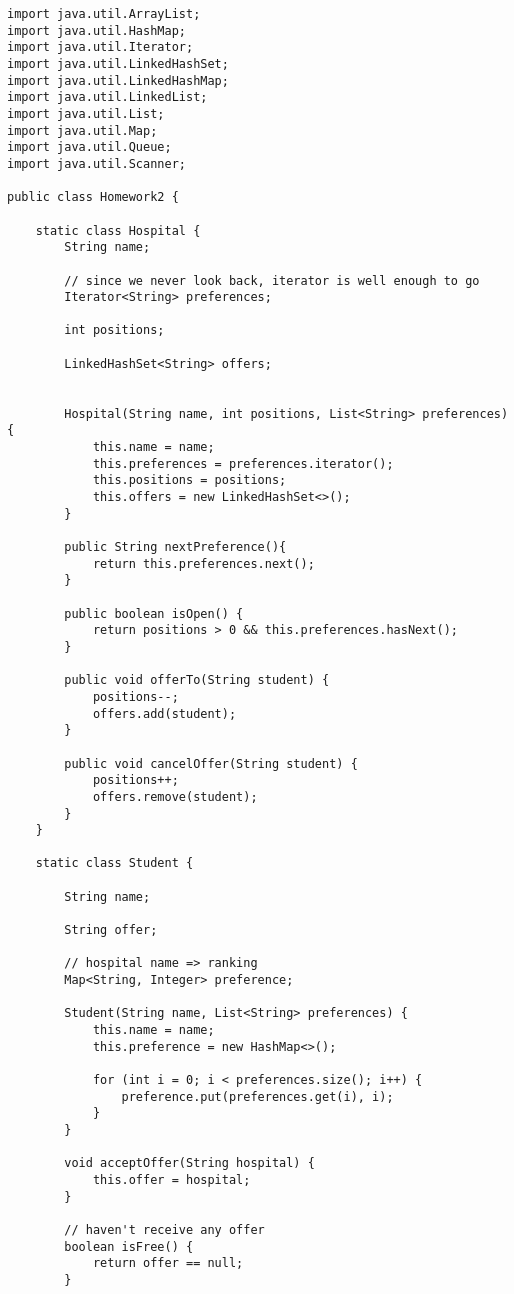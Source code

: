 \documentclass[14pt, a4paper]{article}
\begin{document}
\begin{verbatim}
import java.util.ArrayList;
import java.util.HashMap;
import java.util.Iterator;
import java.util.LinkedHashSet;
import java.util.LinkedHashMap;
import java.util.LinkedList;
import java.util.List;
import java.util.Map;
import java.util.Queue;
import java.util.Scanner;

public class Homework2 {

    static class Hospital {
        String name;
        
        // since we never look back, iterator is well enough to go
        Iterator<String> preferences;

        int positions;

        LinkedHashSet<String> offers;


        Hospital(String name, int positions, List<String> preferences) {
            this.name = name;
            this.preferences = preferences.iterator();
            this.positions = positions;
            this.offers = new LinkedHashSet<>();
        }

        public String nextPreference(){
            return this.preferences.next();
        }

        public boolean isOpen() {
            return positions > 0 && this.preferences.hasNext();
        }

        public void offerTo(String student) {
            positions--;
            offers.add(student);
        }

        public void cancelOffer(String student) {
            positions++;
            offers.remove(student);
        }
    }

    static class Student {

        String name;
        
        String offer;
        
        // hospital name => ranking
        Map<String, Integer> preference;

        Student(String name, List<String> preferences) {
            this.name = name;
            this.preference = new HashMap<>();

            for (int i = 0; i < preferences.size(); i++) {
                preference.put(preferences.get(i), i);
            }
        }

        void acceptOffer(String hospital) {
            this.offer = hospital;
        }

        // haven't receive any offer
        boolean isFree() {
            return offer == null;
        }


\end{verbatim}
\end{document}
